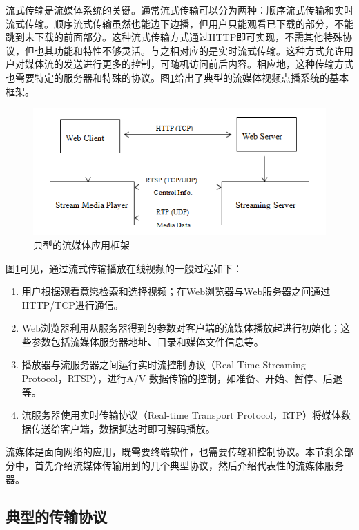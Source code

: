 流式传输是流媒体系统的关键。通常流式传输可以分为两种：顺序流式传输和实时流式传输。顺序流式传输虽然也能边下边播，但用户只能观看已下载的部分，不能跳到未下载的前面部分。这种流式传输方式通过HTTP即可实现，不需其他特殊协议，但也其功能和特性不够灵活。与之相对应的是实时流式传输。这种方式允许用户对媒体流的发送进行更多的控制，可随机访问前后内容。相应地，这种传输方式也需要特定的服务器和特殊的协议。图\ref{fig:10}给出了典型的流媒体视频点播系统的基本框架。

\begin{figure}[h]
	\centering
	\includegraphics[width = 1.0\linewidth]{clip/10.png}
	\caption{典型的流媒体应用框架\label{fig:10}}
\end{figure}

图\ref{fig:10}可见，通过流式传输播放在线视频的一般过程如下：
\begin{enumerate}
\item 用户根据观看意愿检索和选择视频；在Web浏览器与Web服务器之间通过HTTP/TCP进行通信。
\item Web浏览器利用从服务器得到的参数对客户端的流媒体播放起进行初始化；这些参数包括流媒体服务器地址、目录和媒体文件信息等。
\item 播放器与流服务器之间运行实时流控制协议（Real-Time Streaming Protocol，RTSP），进行A/V 数据传输的控制，如准备、开始、暂停、后退等。
\item 流服务器使用实时传输协议（Real-time Transport Protocol，RTP）将媒体数据传送给客户端，数据抵达时即可解码播放。
\end{enumerate}

流媒体是面向网络的应用，既需要终端软件，也需要传输和控制协议。本节剩余部分中，首先介绍流媒体传输用到的几个典型协议，然后介绍代表性的流媒体服务器。

\subsection{典型的传输协议}

